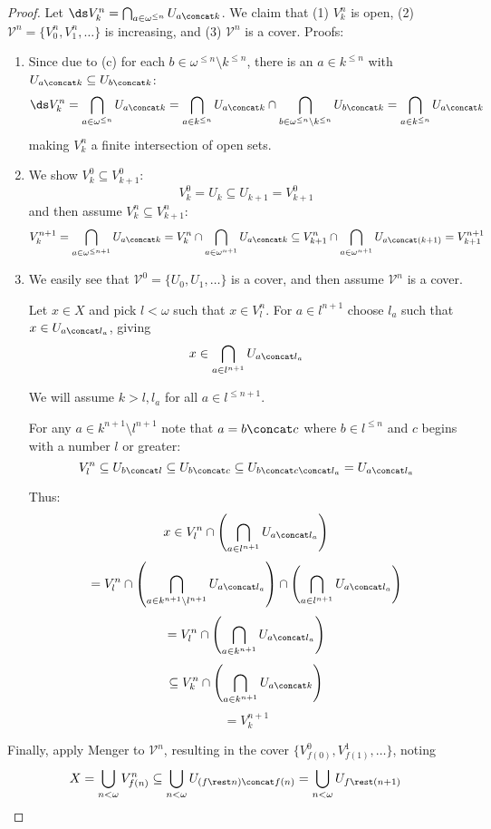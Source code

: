 \begin{proof}
    Let $\ds V_k^n = \bigcap_{a\in\omega^{\leq n}} U_{a\concat k}$. We claim that (1) $V_k^n$ is open, (2) $\mathcal{V}^n=\{V_0^n,V_1^n,\dots\}$ is increasing, and (3) $\mathcal{V}^n$ is a cover. Proofs:

    \begin{enumerate}
      \item
      Since due to (c) for each $b\in \omega^{\leq n} \setminus k^{\leq n}$, there is an $a\in k^{\leq n}$ with $U_{a\concat k} \subseteq U_{b\concat k}$: \[\ds V_k^n = \bigcap_{a\in\omega^{\leq n}} U_{a\concat k} = \bigcap_{a\in k^{\leq n}} U_{a\concat k} \cap \bigcap_{b\in \omega^{\leq n} \setminus k^{\leq n}} U_{b\concat k} = \bigcap_{a\in k^{\leq n}} U_{a\concat k}\] making $V_k^n$ a finite intersection of open sets.

      \item
      We show $V_k^0\subseteq V_{k+1}^0$:
      \[
        V_k^0 = U_k \subseteq U_{k+1} = V_{k+1}^0
      \]
      and then assume $V_k^{n}\subseteq V_{k+1}^{n}$:
      \[
        V_k^{n+1} =
        \bigcap_{a\in{\omega}^{\leq n+1}} U_{a\concat k} =
        V_k^{n} \cap \bigcap_{a\in{\omega}^{n+1}} U_{a\concat k} \subseteq
        V_{k+1}^{n} \cap \bigcap_{a\in{\omega}^{n+1}} U_{a\concat (k+1)} =
        V_{k+1}^{n+1}
      \]

      \item
      We easily see that $\mathcal{V}^0=\{U_0,U_1,\dots\}$ is a cover, and then assume $\mathcal{V}^n$ is a cover.

      Let $x\in X$ and pick $l<\omega$ such that $x \in V^n_l$. For $a \in l^{n+1}$ choose $l_a$ such that $x\in U_{a\concat l_a}$, giving
      \[ x \in \bigcap_{a\in l^{n+1}} U_{a\concat l_a} \]

      We will assume $k>l,l_a$ for all $a\in l^{\leq n+1}$.

      For any $a\in k^{n+1}\setminus l^{n+1}$ note that $a = b\concat c$ where $b\in l^{\leq n}$ and $c$ begins with a number $l$ or greater:
      \[
        V^n_l \subseteq
        U_{b\concat l} \subseteq
        U_{b\concat c} \subseteq
        U_{b\concat c\concat l_a} =
        U_{a\concat l_a}
      \]

      Thus:
      \[
        x \in
        V^n_l \cap \left(\bigcap_{a\in l^{n+1}} U_{a\concat l_a}\right)
      \]
      \[
        =
        V^n_l \cap \left(\bigcap_{a\in k^{n+1}\setminus l^{n+1}} U_{a\concat l_a}\right) \cap \left(\bigcap_{a\in l^{n+1}} U_{a\concat l_a}\right)
      \]
      \[
        =
        V^n_l \cap \left(\bigcap_{a\in k^{n+1}} U_{a\concat l_a}\right)
      \]
      \[
        \subseteq
        V^n_k \cap \left(\bigcap_{a\in k^{n+1}} U_{a\concat k}\right)
      \]
      \[
        =
        V^{n+1}_k
      \]
    \end{enumerate}

    Finally, apply Menger to $\mathcal{V}^n$, resulting in the cover $\{V_{f(0)}^0, V_{f(1)}^1, \dots\}$, noting \[X = \bigcup_{n<\omega}V_{f(n)}^n \subseteq \bigcup_{n<\omega} U_{(f\rest n)\concat f(n)} = \bigcup_{n<\omega} U_{f\rest (n+1)}\]
  \end{proof}

